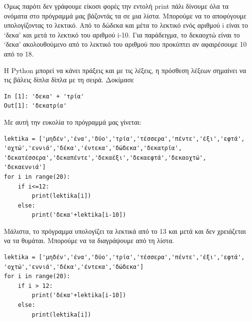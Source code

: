 Όμως παρότι δεν γράφουμε είκοσι φορές την εντολή print πάλι δίνουμε όλα τα ονόματα στο πρόγραμμά μας βάζοντάς τα σε μια λίστα. Μπορούμε να το αποφύγουμε υπολογίζοντας το λεκτικό. Από το δώδεκα και μέτα το λεκτικό ενός αριθμού i είναι το `δεκα' και μετά το λεκτικό του αριθμού i-10. Για παράδειγμα, το δεκαοχτώ είναι το `δεκα' ακολουθούμενο από το λεκτικό του αριθμού που προκύπτει αν αφαιρέσουμε 10 από το 18.

Η Python μπορεί να κάνει πράξεις και με τις λέξεις, η πρόσθεση λέξεων σημαίνει να τις βάλεις δίπλα δίπλα με τη σειρά. Δοκίμασε 
\begin{lstlisting}
In [1]: 'δεκα' + 'τρία'
Out[1]: 'δεκατρία'
\end{lstlisting}
Με αυτή την ευκολία το πρόγραμμά μας γίνεται:
\begin{lstlisting}
lektika = ['μηδέν','ένα','δύο','τρία','τέσσερα','πέντε','έξι','εφτά',
'οχτώ','εννιά','δέκα','έντεκα','δώδεκα','δεκατρία',
'δεκατέσσερα','δεκαπέντε','δεκαέξι','δεκαεφτά','δεκαοχτώ',
'δεκαεννιά']
for i in range(20):
    if i<=12:
        print(lektika[i])
    else:
        print('δεκα'+lektika[i-10])
\end{lstlisting}


Μάλιστα, το πρόγραμμα υπολογίζει τα λεκτικά από το 13 και μετά και δεν χρειάζεται να τα θυμάται. Μπορούμε να τα διαγράψουμε από τη λίστα.
\begin{lstlisting}
lektika = ['μηδέν','ένα','δύο','τρία','τέσσερα','πέντε','έξι','εφτά',
'οχτώ','εννιά','δέκα','έντεκα','δώδεκα']
for i in range(20):
    if i > 12:
        print('δέκα'+lektika[i-10])
    else:
        print(lektika[i])
\end{lstlisting}

